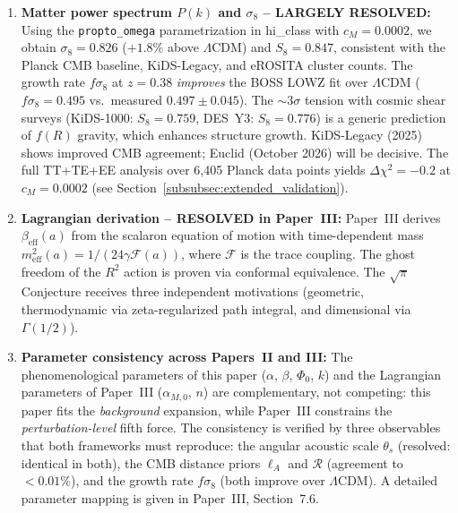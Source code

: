 \documentclass[aps,prd,twocolumn,superscriptaddress,nofootinbib,floatfix]{revtex4-2}
\begin{document}
\begin{enumerate}
\item \textbf{Matter power spectrum $P(k)$ and $\sigma_8$ -- LARGELY RESOLVED:} Using the \texttt{propto\_\allowbreak omega} parametrization in hi\_class with $c_M = 0.0002$, we obtain $\sigma_8 = 0.826$ ($+1.8\%$ above $\Lambda$CDM) and $S_8 = 0.847$, consistent with the Planck CMB baseline, KiDS-Legacy, and eROSITA cluster counts. The growth rate $f\sigma_8$ at $z = 0.38$ \textit{improves} the BOSS LOWZ fit over $\Lambda$CDM ($f\sigma_8 = 0.495$ vs.\ measured $0.497 \pm 0.045$). The $\sim 3\sigma$ tension with cosmic shear surveys (KiDS-1000: $S_8 = 0.759$, DES~Y3: $S_8 = 0.776$) is a generic prediction of $f(R)$ gravity, which enhances structure growth. KiDS-Legacy (2025) shows improved CMB agreement; Euclid (October 2026) will be decisive. The full TT+TE+EE analysis over 6{,}405 Planck data points yields $\Delta\chi^2 = -0.2$ at $c_M = 0.0002$ (see Section~\ref{subsubsec:extended_validation}).

\item \textbf{Lagrangian derivation -- RESOLVED in Paper~III:} Paper~III \cite{Geiger2026c} derives $\beta_{\mathrm{eff}}(a)$ from the scalaron equation of motion with time-dependent mass $m_{\mathrm{eff}}^2(a) = 1/(24\gamma\mathcal{F}(a))$, where $\mathcal{F}$ is the trace coupling. The ghost freedom of the $R^2$ action is proven via conformal equivalence. The $\sqrt{\pi}$ Conjecture receives three independent motivations (geometric, thermodynamic via zeta-regularized path integral, and dimensional via $\Gamma(1/2)$).

\item \textbf{Parameter consistency across Papers~II and III:} The phenomenological parameters of this paper ($\alpha$, $\beta$, $\Phi_0$, $k$) and the Lagrangian parameters of Paper~III ($\alpha_{M,0}$, $n$) are complementary, not competing: this paper fits the \textit{background} expansion, while Paper~III constrains the \textit{perturbation-level} fifth force. The consistency is verified by three observables that both frameworks must reproduce: the angular acoustic scale $\theta_s$ (resolved: identical in both), the CMB distance priors $\ell_A$ and $\mathcal{R}$ (agreement to $<0.01\%$), and the growth rate $f\sigma_8$ (both improve over $\Lambda$CDM). A detailed parameter mapping is given in Paper~III, Section~7.6.
\end{enumerate}


\end{document}
